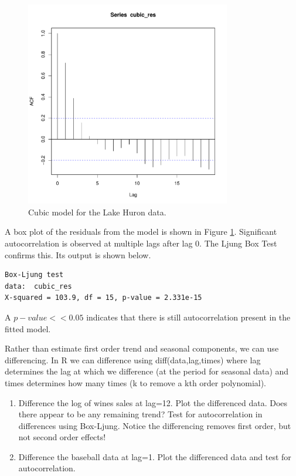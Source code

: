 \documentclass[12pt]{article}
\newenvironment{solution}[2][Solution]{\begin{trivlist}
\item[\hskip \labelsep {\bfseries #1}]}{\end{trivlist}}
\newenvironment{problem}[2][Problem]{\begin{trivlist}
\item[\hskip \labelsep {\bfseries #1}\hskip \labelsep {\bfseries #2.}]}{\end{trivlist}}
\begin{document}
\begin{solution}{}
\begin{figure}[h]
    \centering
    \includegraphics[width=0.8\textwidth]{figs/problem_9/cubic_fit_ACF.pdf}
    \vspace*{-0.5cm}
    \caption{Cubic model for the Lake Huron data.}
    \label{fig:cubic_fit_ACF}
\end{figure}
\newpage
\noindent
A box plot of the residuals from the model is shown in Figure \ref{fig:cubic_fit_ACF}. Significant autocorrelation is observed at multiple lags after lag 0. The Ljung Box Test confirms this. Its output is shown below. 

\begin{lstlisting}
Box-Ljung test
data:  cubic_res
X-squared = 103.9, df = 15, p-value = 2.331e-15
\end{lstlisting}

\noindent
A $p-value << 0.05$ indicates that there is still autocorrelation present in the fitted model.

\end{solution}
\pagebreak

\begin{problem}{10}
Rather than estimate first order trend and seasonal components, we can use differencing. In R we can difference using diff(data,lag,times) where lag determines the lag at which we difference (at the period for seasonal data) and times determines how many times (k to remove a kth order polynomial). 
\begin{enumerate}[label=(\alph*)]
    \item Difference the log of wines sales at lag=12. Plot the differenced data. Does there appear to be any remaining trend?  Test for autocorrelation in differences using Box-Ljung. Notice the differencing removes first order, but not second order effects!
    \item  Difference the baseball data at lag=1. Plot the differenced data and test for autocorrelation.    
\end{enumerate}
\end{problem}
\end{document}
